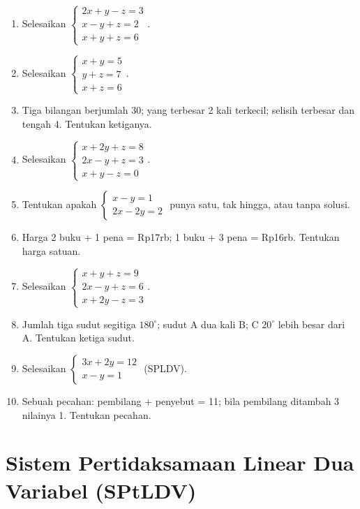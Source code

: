 \documentclass[11pt,a4paper]{report}
\theoremstyle{gaya}
\begin{document}
\begin{latihan}
\begin{enumerate}[leftmargin=*]
  \item Selesaikan $\begin{cases} 2x+y-z=3\\ x-y+z=2\\ x+y+z=6\end{cases}$.
  \item Selesaikan $\begin{cases} x+y=5\\ y+z=7\\ x+z=6\end{cases}$.
  \item Tiga bilangan berjumlah 30; yang terbesar 2 kali terkecil; selisih terbesar dan tengah 4. Tentukan ketiganya.
  \item Selesaikan $\begin{cases} x+2y+z=8\\ 2x-y+z=3\\ x+y-z=0\end{cases}$.
  \item Tentukan apakah $\begin{cases} x-y=1\\ 2x-2y=2\end{cases}$ punya satu, tak hingga, atau tanpa solusi.
  \item Harga 2 buku + 1 pena = Rp17rb; 1 buku + 3 pena = Rp16rb. Tentukan harga satuan.
  \item Selesaikan $\begin{cases} x+y+z=9\\ 2x-y+z=6\\ x+2y-z=3\end{cases}$.
  \item Jumlah tiga sudut segitiga $180^\circ$; sudut A dua kali B; C $20^\circ$ lebih besar dari A. Tentukan ketiga sudut.
  \item Selesaikan $\begin{cases} 3x+2y=12\\ x-y=1\end{cases}$ (SPLDV).
  \item Sebuah pecahan: pembilang + penyebut = 11; bila pembilang ditambah 3 nilainya 1. Tentukan pecahan.
\end{enumerate}
\end{latihan}

\section{Sistem Pertidaksamaan Linear Dua Variabel (SPtLDV)}
\end{document}
